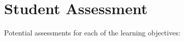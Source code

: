 \documentclass[main.tex]{subfiles}
\begin{document}
\section*{Student Assessment} 
Potential assessments for each of the learning objectives:
\end{document}
